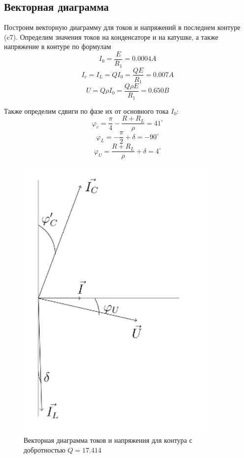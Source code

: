 \documentclass[a4paper]{article}
\begin{document}
\subsection{Векторная диаграмма}

Построим векторную диаграмму для токов и напряжений в последнем контуре (c7). Определим значения токов на конденсаторе и на катушке, а также напряжение в контуре по формулам
    $$I_0 = \frac{E}{R_1} = 0.0004 A$$
    $$I_c = I_L = Q I_0 = \frac{Q E}{R_1} = 0.007 A$$
    $$U = Q\rho I_0 = \frac{Q\rho E}{R_1} = 0.650B$$

Также определим сдвиги по фазе их от основного тока $I_0$:
    $$\varphi_c = \frac{\pi}{4} - \frac{R + R_L}{\rho} =  41^{\circ}$$
    $$\varphi_L = -\frac{\pi}{2} + \delta = -90 ^{\circ}$$
    $$\varphi_U = \frac{R + R_L}{\rho} + \delta = 4^{\circ} $$

\begin{figure}[H]
    \centering
    \includegraphics[width=10cm]{Screenshot from 2023-10-11 14-58-30.png}
    \caption{Векторная диаграмма токов и напряжения для контура с добротностью $Q = 17.414$}
    \label{fig:vac}
\end{figure}
\end{document}
